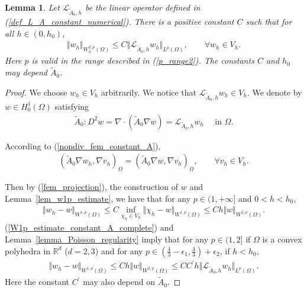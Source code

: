 \documentclass[12pt]{amsart}
\newtheorem{lemma}{Lemma}[section]
\theoremstyle{definition}
\theoremstyle{remark}
\begin{document}
\begin{lemma}
\label{lemma_gloabl_w2p_estiamte_constant_A}
Let $\mathcal{L}_{\tilde{A}_{0},h}$ be the linear operator defined 
in (\ref{def_L_A_constant_numerical}). 
There is a positive constant $C$ such that for all $h \in (0, h_{0})$,
\begin{align}
\label{gloabl_w2p_estiamte_constant_A}
\Vert w_{h}\Vert_{W_{h}^{2,p}(\Omega)} \leq C \Vert \mathcal{L}_{\tilde{A}_{0},h} w_{h}\Vert_{L^{p}(\Omega)}, 
\qquad \forall w_{h} \in V_{h}.
\end{align}
Here $p$ is valid in the range described in (\ref{p_range2}).
The constants $C$ and $h_{0}$ may depend $\tilde{A}_{0}$.
\end{lemma}

\begin{proof}
We choose $w_{h} \in V_{h}$ arbitrarily. We notice that $\mathcal{L}_{\tilde{A}_{0},h}w_{h} \in V_{h}$.
We denote by $w\in H_{0}^{1}(\Omega)$ satisfying 
\begin{align*}
\tilde{A}_{0}: D^{2} w = \nabla \cdot \left( \tilde{A}_{0} \nabla w\right) = \mathcal{L}_{\tilde{A}_{0},h}w_{h} 
\quad \text{ in } \Omega.
\end{align*}

According to (\ref{nondiv_fem_constant_A}), 
\begin{align}
\label{fem_projection}
(\tilde{A}_{0}\nabla w_{h}, \nabla v_{h})_{\Omega} 
= (\tilde{A}_{0}\nabla w, \nabla v_{h})_{\Omega}, 
\qquad \forall v_{h} \in V_{h}.
\end{align}

Then by (\ref{fem_projection}),  the construction of $w$ 
and Lemma~\ref{lem_w1p_estimate}, we have that
for any $p\in (1,+\infty]$ and $0< h < h_{0}$, 
\begin{align}
\label{W1p_estimate_constant_A_complete}
\Vert w_{h} - w \Vert_{W^{1,p}(\Omega)} \leq C \inf_{\chi_{h}\in V_{h}} 
\Vert \chi_{h} - w \Vert_{W^{1,p}(\Omega)}\leq C h \Vert w\Vert_{W^{2,p}(\Omega)}.
\end{align}
(\ref{W1p_estimate_constant_A_complete}) and Lemma~\ref{lemma_Poisson_regularity} 
imply that for any $p \in (1, 2]$ if $\Omega$ is a convex polyhedra in 
$\mathbb{R}^{d}$ ($d=2,3$) and for any $p \in (\frac{4}{3}-\epsilon_{1}, 
\frac{4}{3}) + \epsilon_{2}$, if $h < h_{0}$,
\begin{align}
\label{W1p_estimate_constant_A} 
\Vert w_{h} - w \Vert_{W^{1,p}(\Omega)} 
\leq C h \Vert w\Vert_{W^{2,p}(\Omega)}
\leq CC^{\prime} h \Vert \mathcal{L}_{\tilde{A}_{0},h}w_{h}\Vert_{L^{p}(\Omega)}.
\end{align}
Here the constant $C^{\prime}$ may also depend on $\tilde{A}_{0}$.


\end{proof}
\end{document}

